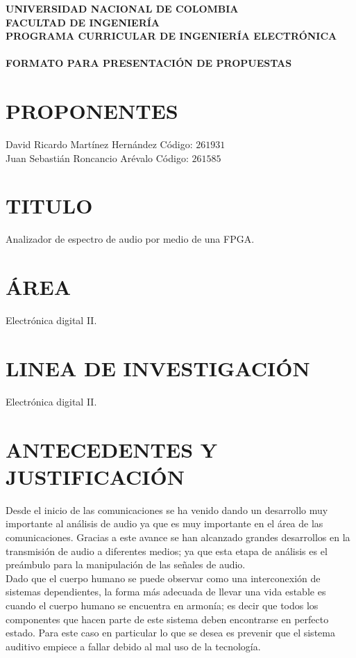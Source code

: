 \documentclass[10pt,graphicx,caption,rotating]{article}
\begin{document}
\date{}
{\centering \textbf{ \Large {UNIVERSIDAD NACIONAL DE COLOMBIA \\
FACULTAD DE INGENIERÍA\[\]}}}
\textbf{ \Large {PROGRAMA CURRICULAR DE INGENIERÍA ELECTRÓNICA}} \\ \\
\textbf{ \Large {FORMATO PARA PRESENTACIÓN DE PROPUESTAS}}

\section{PROPONENTES}
\noindent
David Ricardo Martínez Hernández \hspace{0.78cm} Código: $261931$\\
Juan Sebastián Roncancio Arévalo \hspace{0.95cm} Código: $261585$

\section{TITULO}
\noindent
Analizador de espectro de audio por medio de una FPGA.

\section{ÁREA}
\noindent
Electrónica digital II.

\section{LINEA DE INVESTIGACIÓN}
\noindent
Electrónica digital II.

\section{ANTECEDENTES Y JUSTIFICACIÓN}
\noindent
Desde el  inicio de las comunicaciones se ha venido dando un desarrollo muy importante al análisis de audio ya que es muy importante en el área de las comunicaciones. Gracias a este  avance se han alcanzado grandes desarrollos en la transmisión de audio a diferentes medios; ya que esta etapa de análisis es el preámbulo para la manipulación de las señales de audio.\\
Dado que el cuerpo humano se puede observar como una interconexión de sistemas dependientes, la forma más adecuada de llevar una vida estable es cuando el cuerpo humano se encuentra en armonía; es decir que todos los componentes que hacen parte de este sistema deben encontrarse en perfecto estado.
Para este caso en particular lo que se desea es prevenir que el sistema auditivo empiece a fallar debido al mal uso de la tecnología.
\end{document}
